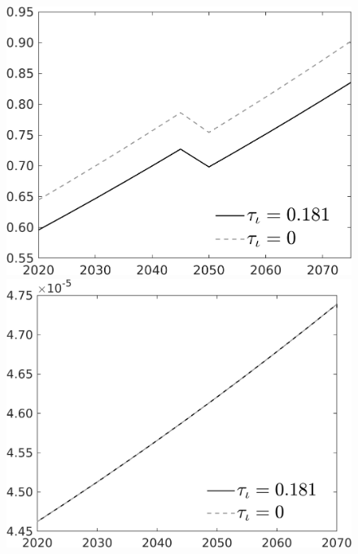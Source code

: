\documentclass[12pt]{article}
\begin{document}
\begin{figure}[h!!]
\begin{minipage}[]{0.32\textwidth}
	\end{minipage}	
	\begin{minipage}[]{0.32\textwidth}
		\includegraphics[width=1\textwidth]{../../codding_model/own_basedOnFried/optimalPol_010922_revision/figures/all_13Sept22/CompTauf_bytaul_Reg0_C_spillover0_nsk0_xgr1_knspil0_sep0_LFlimit1_emsbase0_countec0_GovRev0_etaa0.79_lgd1.png}
	\end{minipage}	
	\begin{minipage}[]{0.32\textwidth}
		\includegraphics[width=1\textwidth]{../../codding_model/own_basedOnFried/optimalPol_010922_revision/figures/all_13Sept22/CompTauf_bytaul_Reg0_gAf_spillover0_nsk0_xgr1_knspil0_sep0_LFlimit1_emsbase0_countec0_GovRev0_etaa0.79_lgd1.png}

\end{minipage}
\end{figure}
\end{document}
